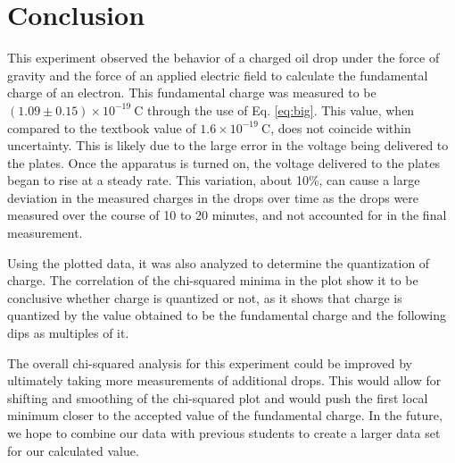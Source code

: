 \documentclass[%
 reprint,
 amsmath,amssymb,
 aps,
]{revtex4-2}
\begin{document}
\section{Conclusion}
This experiment observed the behavior of a charged oil drop under the force of gravity and the force of an applied electric field to calculate the fundamental charge of an electron. This fundamental charge was measured to be $(1.09\pm 0.15)\times10^{-19} \ \mathrm{C}$ through the use of Eq. \ref{eq:big}. This value, when compared to the textbook value of $1.6 \times 10^{-19} \ \mathrm{C}$, does not coincide within uncertainty. This is likely due to the large error in the voltage being delivered to the plates. Once the apparatus is turned on, the voltage delivered to the plates began to rise at a steady rate. This variation, about 10\%, can cause a large deviation in the measured charges in the drops over time as the drops were measured over the course of 10 to 20 minutes, and not accounted for in the final measurement.  

Using the plotted data, it was also analyzed to determine the quantization of charge. The correlation of the chi-squared minima in the plot show it to be conclusive whether charge is quantized or not, as it shows that charge is  quantized by the value obtained to be the fundamental charge and the following dips as multiples of it. 

The overall chi-squared analysis for this experiment could be improved by ultimately taking more measurements of additional drops. This would allow for shifting and smoothing of the chi-squared plot and would push the first local minimum closer to the accepted value of the fundamental charge. In the future, we hope to combine our data with previous students to create a larger data set for our calculated value.

\nocite{*}

\end{document}
